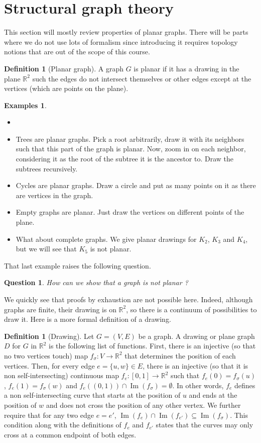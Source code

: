 \documentclass{tufte-handout}
\newtheorem{quest}[thm]{Question}
\theoremstyle{definition}
\newtheorem{defn}[thm]{Definition}
\newtheorem{exmps}[thm]{Examples}
\theoremstyle{remark}
\newcommand{\R}{\mathbb{R}}
\DeclareMathOperator{\im}{Im}
\begin{document}
\section{Structural graph theory}
This section will mostly review properties of planar graphs. There will be parts where we do not use lots of formalism since introducing it requires topology notions that are out of the scope of this course.
\begin{defn}[Planar graph]
	A graph $G$ is planar if it has a drawing in the plane $\R^2$ such the edges do not intersect themselves or other edges except at the vertices (which are points on the plane).
\end{defn}
\begin{exmps}
	\begin{itemize}\item[]
		\item Trees are planar graphs. Pick a root arbitrarily, draw it with its neighbors such that this part of the graph is planar. Now, zoom in on each neighbor, considering it as the root of the subtree it is the ancestor to. Draw the subtrees recursively.
		\item Cycles are planar graphs. Draw a circle and put as many points on it as there are vertices in the graph.
		\item Empty graphs are planar. Just draw the vertices on different points of the plane.
		\item What about complete graphs. We give planar drawings for $K_2$, $K_3$ and $K_4$, but we will see that $K_5$ is not planar.
	\end{itemize}
\end{exmps}
That last example raises the following question.
\begin{quest}
	How can we show that a graph is not planar ?
\end{quest}
We quickly see that proofs by exhaustion are not possible here. Indeed, although graphs are finite, their drawing is on $\R^2$, so there is a continuum of possibilities to draw it. Here is a more formal definition of a drawing.
\begin{defn}[Drawing]
	Let $G=(V,E)$ be a graph. A drawing or plane graph $D$ for $G$ in $\R^2$ is the following list of functions. First, there is an injective (so that no two vertices touch) map $f_{\sigma} : V \rightarrow \R^2$ that determines the position of each vertices. Then, for every edge $e = \{u,w\} \in E$, there is an injective (so that it is non self-intersecting) continuous map $f_e : [0,1] \rightarrow \R^2$ such that $f_e(0) = f_{\sigma}(u)$, $f_e(1) = f_{\sigma}(w)$ and $f_e((0,1)) \cap \im(f_{\sigma}) = \emptyset$. In other words, $f_e$ defines a non self-intersecting curve that starts at the position of $u$ and ends at the position of $w$ and does not cross the position of any other vertex. We further require that for any two edge $e = e'$, $\im(f_e) \cap \im(f_{e'}) \subseteq \im(f_{\sigma})$. This condition along with the definitions of $f_e$ and $f_{e'}$ states that the curves may only cross at a common endpoint of both edges.
\end{defn}
\end{document}
